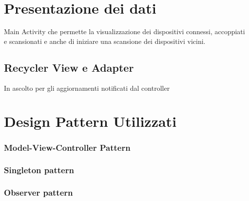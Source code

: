 \section{Presentazione dei dati}
Main Activity che permette la visualizzazione dei dispositivi connessi, accoppiati e scansionati e anche di iniziare una scansione dei dispositivi vicini.

\subsection{Recycler View e Adapter}
In ascolto per gli aggiornamenti notificati dal controller


\section{Design Pattern Utilizzati}
\subsubsection{Model-View-Controller Pattern}
\subsubsection{Singleton pattern}
\subsubsection{Observer pattern}

